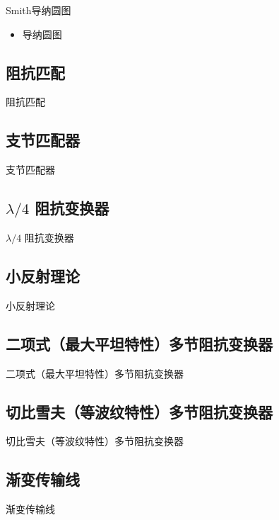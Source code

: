 \begin{frame}{Smith导纳圆图}
  \begin{itemize}
    \item 导纳圆图
  \end{itemize}
\end{frame}

\subsection{阻抗匹配}
\begin{frame}{阻抗匹配}

\end{frame}

\subsection{支节匹配器}
\begin{frame}{支节匹配器}

\end{frame}

\subsection{$\lambda/4$ 阻抗变换器}
\begin{frame}{$\lambda/4$ 阻抗变换器}

\end{frame}

\subsection{小反射理论}
\begin{frame}{小反射理论}

\end{frame}

\subsection{二项式（最大平坦特性）多节阻抗变换器}
\begin{frame}{二项式（最大平坦特性）多节阻抗变换器}

\end{frame}

\subsection{切比雪夫（等波纹特性）多节阻抗变换器}
\begin{frame}{切比雪夫（等波纹特性）多节阻抗变换器}

\end{frame}

\subsection{渐变传输线}
\begin{frame}{渐变传输线}

\end{frame}
